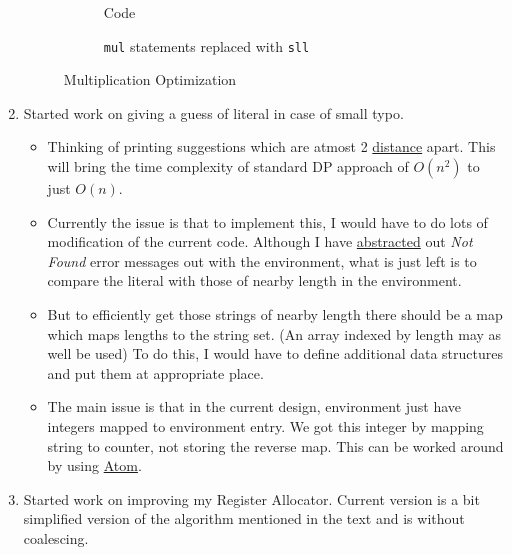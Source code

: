 \begin{enumerate}
    \begin{figure}[t!]
      \centering
      \begin{subfigure}[t]{\textwidth}
      \centering
      \caption{Code}
      \label{fig:mulopt1}
      \end{subfigure}
      \begin{subfigure}[t]{0.8\textwidth}
      \centering
      \caption{\texttt{mul} statements replaced with \texttt{sll}}
      \label{fig:mulopt2}
      \end{subfigure}
      \caption{Multiplication Optimization}
    \end{figure}
  \item Started work on giving a guess of literal in case of small typo. 
  \begin{itemize}
    \item Thinking of printing suggestions which are atmost 2 \href{https://en.wikipedia.org/wiki/Edit_distance}{distance} apart. This will bring the time complexity of standard DP approach of $O(n^2)$ to just $O(n)$. 
    \item Currently the issue is that to implement this, I would have to do lots of modification of the current code. Although I have \href{https://github.com/sourabh2311/btp/commit/8f27478a3c51b9e41bef68961a28c400d4ef29dd}{abstracted} out \textit{Not Found} error messages out with the environment, what is just left is to compare the literal with those of nearby length in the environment. 
    \item But to efficiently get those strings of nearby length there should be a map which maps lengths to the string set. (An array indexed by length may as well be used) To do this, I would have to define additional data structures and put them at appropriate place. 
    \item The main issue is that in the current design, environment just have integers mapped to environment entry. We got this integer by mapping string to counter, not storing the reverse map. This can be worked around by using \href{http://www.cs.utah.edu/~mjones/sml-nj-lib/atom.html}{Atom}.  
  \end{itemize}
  \item Started work on improving my Register Allocator. Current version is a bit simplified version of the algorithm mentioned in the text and is without coalescing.
\end{enumerate}

